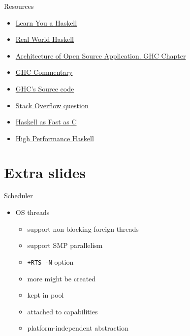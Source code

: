 \documentclass{beamer}
\begin{document}
\begin{frame}{Resources}
  \begin{itemize}
    \item \href{http://learnyouahaskell.com/}{Learn You a Haskell}
    \item \href{http://book.realworldhaskell.org/read/}{Real World Haskell}
    \item \href{http://www.aosabook.org/en/ghc.html}{Architecture of Open Source Application. GHC Chapter}
    \item \href{http://hackage.haskell.org/trac/ghc/wiki/Commentary}{GHC Commentary}
    \item \href{https://github.com/ghc/ghc}{GHC's Source code}
    \item \href{http://stackoverflow.com/questions/6121146/reading-ghc-core}{Stack Overflow question}
    \item \href{http://donsbot.wordpress.com/2008/06/04/haskell-as-fast-as-c-working-at-a-high-altitude-for-low-level-performance/}{Haskell as Fast as C}
    \item \href{http://blog.johantibell.com/2010/09/slides-from-my-high-performance-haskell.html}{High Performance Haskell}
  \end{itemize}
\end{frame}

\section{Extra slides}
\frame{\tableofcontents[currentsection]}

\begin{frame}{Scheduler}
  \begin{itemize}
    \item OS threads
    \begin{itemize}
      \item support non-blocking foreign threads
      \item support SMP parallelism
      \pause
      \item \texttt{+RTS -N} option
      \item more might be created
      \item kept in pool
      \item attached to capabilities
      \item platform-independent abstraction
    \end{itemize}
  \end{itemize}
\end{frame}
\end{document}
